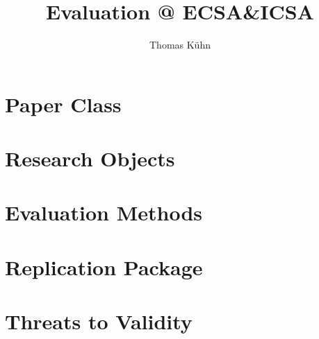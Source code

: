 \documentclass[a4paper, 11pt, twoside=semi]{scrartcl}
\author{Thomas Kühn}
\title{Evaluation @ ECSA\&ICSA}
\begin{document}
\section{Paper Class}






\section{Research Objects}





%


\section{Evaluation Methods}







\section{Replication Package}

























\section{Threats to Validity}
\end{document}
